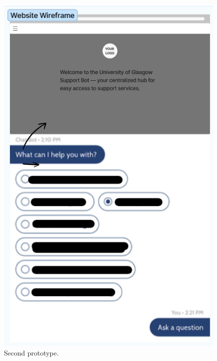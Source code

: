 \documentclass{l4proj}
\begin{document}
\begin{appendices}
\begin{figure}[h!]
  \centering
  \begin{adjustbox}{center,max height=0.5\textheight, max width=\linewidth}
    \includegraphics{images/initial2.png}
  \end{adjustbox}
  \caption{Second prototype.}
\end{figure}


\end{appendices}
\end{document}
